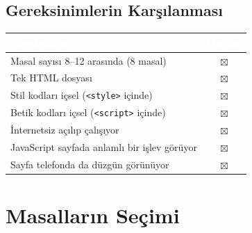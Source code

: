 \documentclass[12pt,a4paper]{article}
\begin{document}
\subsection{Gereksinimlerin Karşılanması}
\begin{center}
\begin{tabular}{@{}p{8.2cm}c@{}}
\toprule
\rowcolor{ana}\textcolor{white}{\textbf{Gereksinim}} & \textcolor{white}{\textbf{Durum}} \\
\midrule
Masal sayısı 8--12 arasında (8 masal)         & $\boxtimes$  \\
Tek HTML dosyası                                    & $\boxtimes$  \\
Stil kodları içsel (\texttt{<style>} içinde)        & $\boxtimes$ \\
Betik kodları içsel (\texttt{<script>} içinde)      & $\boxtimes$  \\
İnternetsiz açılıp çalışıyor                        & $\boxtimes$  \\
JavaScript sayfada anlamlı bir işlev görüyor        & $\boxtimes$  \\
Sayfa telefonda da düzgün görünüyor                 & $\boxtimes$ \\
\bottomrule
\end{tabular}
\end{center}

\section{Masalların Seçimi}
\end{document}

